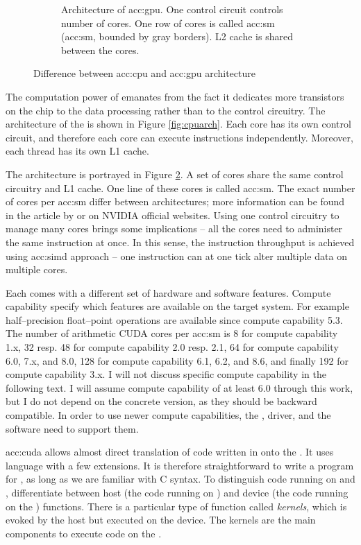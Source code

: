 \begin{figure}
\begin{subfigure}[t]{0.47\textwidth}
        \caption{Architecture of \acrshort*{acc:gpu}. One control circuit controls number of cores. One row of cores is called \acrlong{acc:sm} (\acrshort{acc:sm}, bounded by gray borders). L2 cache is shared between the cores.}
        \label{fig:gpuarch}
    \end{subfigure}
    \caption{Difference between \acrshort*{acc:cpu} and \acrshort*{acc:gpu} architecture}
\end{figure}

The computation power of \gpu emanates from the fact it dedicates more transistors on the chip to the data processing rather than to the control circuitry. The architecture of the \cpu is shown in Figure \ref{fig:cpuarch}. Each core has its own control circuit, and therefore each core can execute instructions independently. Moreover, each thread has its own L1 cache.

The \gpu{} architecture is portrayed in Figure \ref{fig:gpuarch}. A set of cores share the same control circuitry and L1 cache. One line of these cores is called \acrfull{acc:sm}. The exact number of cores per \acrshort{acc:sm} differ between architectures; more information can be found in the article by \citet{NVIDIAhistory} or on NVIDIA official websites. Using one control circuitry to manage many cores brings some implications -- all the cores need to administer the same instruction at once. In this sense, the instruction throughput is achieved using \acrfull{acc:simd} approach -- one instruction can at one tick alter multiple data on multiple cores.

Each \gpu comes with a different set of hardware and software features. Compute capability specify which features are available on the target system. For example half--precision float--point operations are available since compute capability 5.3. The number of arithmetic CUDA cores per \acrshort{acc:sm} is 8 for compute capability 1.x, 32 resp. 48 for compute capability 2.0 resp. 2.1, 64 for compute capability 6.0, 7.x, and 8.0, 128 for compute capability 6.1, 6.2, and 8.6, and finally 192 for compute capability 3.x. I will not discuss specific compute capability in the following text. I will assume compute capability of at least 6.0 through this work, but I do not depend on the concrete version, as they should be backward compatible. In order to use newer compute capabilities, the \gpu, driver, and the software need to support them.

\acrlong{acc:cuda} allows almost direct translation of code written in \cpp onto the \gpuns. It uses \cpp language with a few extensions. It is therefore straightforward to write a program for \gpuns, as long as we are familiar with C syntax. To distinguish code running on \cpu and \gpu, \cuda differentiate between host (the code running on \cpuns) and device (the code running on the \gpuns) functions. There is a particular type of function called \emph{kernels}, which is evoked by the host but executed on the device. The kernels are the main components to execute code on the \gpuns.

